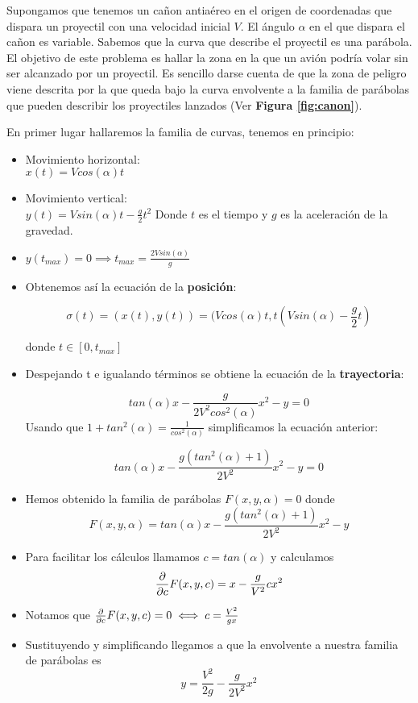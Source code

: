 \begin{example}
Supongamos que tenemos un cañon antiaéreo en el origen de coordenadas que dispara un proyectil con una velocidad inicial $V$. El ángulo $\alpha$ en el que dispara el cañon es variable. Sabemos que la curva que describe el proyectil es una parábola. El objetivo de este problema es hallar la zona en la que un avión podría volar sin ser alcanzado por un proyectil. Es sencillo darse cuenta de que la zona de peligro viene descrita por la que queda bajo la curva envolvente a la familia de parábolas que pueden describir los proyectiles lanzados (Ver \textbf{Figura \ref{fig:canon}}). 

En primer lugar hallaremos la familia de curvas, tenemos en principio:
\begin{itemize}
\item Movimiento horizontal:\\ $x(t) = Vcos(\alpha)t$
\item Movimiento vertical:\\ $y(t) = Vsin(\alpha)t-\frac{g}{2}t^2$
Donde $t$ es el tiempo y $g$ es la aceleración de la gravedad.
\item $y(t_{max}) = 0 \implies t_{max} = \frac{2Vsin(\alpha)}{g}$
\item Obtenemos así la ecuación de la \textbf{posición}:

$$\sigma(t) = (x(t), y(t)) = (Vcos(\alpha)t, t(Vsin(\alpha)-\frac{g}{2}t)$$ 

donde $t\in[0, t_{max}]$
\item Despejando t e igualando términos se obtiene la ecuación de la \textbf{trayectoria}:

$$tan(\alpha)x-\frac{g}{2V^2cos^2(\alpha)}x^2-y = 0$$
Usando que $1+tan^2(\alpha) = \frac{1}{cos^2(\alpha)}$ simplificamos la ecuación anterior:

$$tan(\alpha)x - \frac{g(tan^2(\alpha)+1)}{2V^2}x^2-y = 0$$
\item Hemos obtenido la familia de parábolas $F(x,y,\alpha) = 0$ donde
$$F(x,y, \alpha) = tan(\alpha)x - \frac{g(tan^2(\alpha)+1)}{2V^2}x^2-y$$
\item Para facilitar los cálculos llamamos $c=tan(\alpha)$ y calculamos
$$\frac{\partial}{\partial c}F(x,y,c) = x-\frac{g}{V^2}cx^2$$
\item Notamos que $\frac{\partial}{\partial c}F(x,y,c) = 0 \iff c=\frac{V^2}{gx}$
\item Sustituyendo y simplificando llegamos a que la envolvente a nuestra familia de parábolas es
$$y=\frac{V^2}{2g}-\frac{g}{2V^2}x^2$$
\end{itemize}
\end{example}

